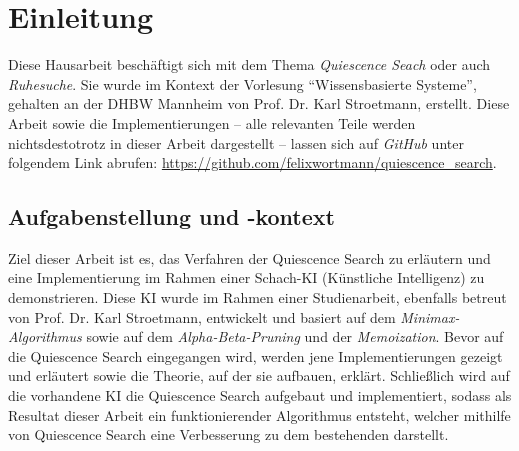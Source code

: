 
\chapter{Einleitung}
Diese Hausarbeit beschäftigt sich mit dem Thema \textit{Quiescence Seach} oder auch \textit{Ruhesuche}. Sie wurde im Kontext der Vorlesung "`Wissensbasierte Systeme"', gehalten an der DHBW Mannheim von Prof. Dr. Karl Stroetmann, erstellt. Diese Arbeit sowie die Implementierungen -- alle relevanten Teile werden nichtsdestotrotz in dieser Arbeit dargestellt -- lassen sich auf \textit{GitHub} unter folgendem Link abrufen: \url{https://github.com/felixwortmann/quiescence_search}.

\section{Aufgabenstellung und -kontext}
Ziel dieser Arbeit ist es, das Verfahren der Quiescence Search zu erläutern und eine Implementierung im Rahmen einer Schach-KI (Künstliche Intelligenz) zu demonstrieren. Diese KI wurde im Rahmen einer Studienarbeit, ebenfalls betreut von Prof. Dr. Karl Stroetmann, entwickelt und basiert auf dem \textit{Minimax-Algorithmus} sowie auf dem \textit{Alpha-Beta-Pruning} und der \textit{Memoization}. Bevor auf die Quiescence Search eingegangen wird, werden jene Implementierungen gezeigt und erläutert sowie die Theorie, auf der sie aufbauen, erklärt. Schließlich wird auf die vorhandene KI die Quiescence Search aufgebaut und implementiert, sodass als Resultat dieser Arbeit ein funktionierender Algorithmus entsteht, welcher mithilfe von Quiescence Search eine Verbesserung zu dem bestehenden darstellt.